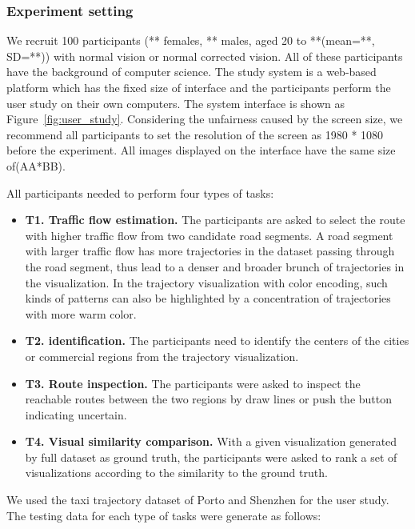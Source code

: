 \subsubsection{Experiment setting}

We recruit 100 participants (** females, ** males, aged 20 to **(mean=**, SD=**)) with normal vision or normal corrected vision. All of these participants have the background of computer science. 
The study system is a web-based platform which has the fixed size of interface and the participants perform the user study on their own  computers.  The system interface is shown as Figure~\ref{fig:user_study}. Considering the unfairness caused by the screen size, we recommend all participants to set the resolution of the screen as 1980 * 1080 before the experiment. All images displayed on the interface have the same size of(AA*BB).  

All participants needed to perform four types of tasks:
\begin{itemize}[noitemsep]
	\item \textbf{T1. Traffic flow estimation.} 
	The participants are asked to select the route with higher traffic flow from two candidate road segments.
	A road segment with larger traffic flow has more trajectories in the dataset passing through the road segment, thus lead to a denser and broader brunch of trajectories in the visualization.  In the trajectory visualization with color encoding, such kinds of patterns can also be highlighted by a concentration of trajectories with more warm color.
	\item \textbf{T2.  identification.} The participants need to identify the centers of the cities or commercial regions from the trajectory visualization.
	\item \textbf{T3. Route inspection.} The participants were asked to inspect the reachable routes between the two regions by draw lines or push the button indicating uncertain.
	\item \textbf{T4. Visual similarity comparison.} With a given visualization generated by full dataset as ground truth, the participants were asked to rank a set of visualizations according to the similarity to the ground truth. 
\end{itemize}

We used the taxi trajectory dataset of Porto and Shenzhen for the user study. The testing data for each type of tasks were generate as follows:

